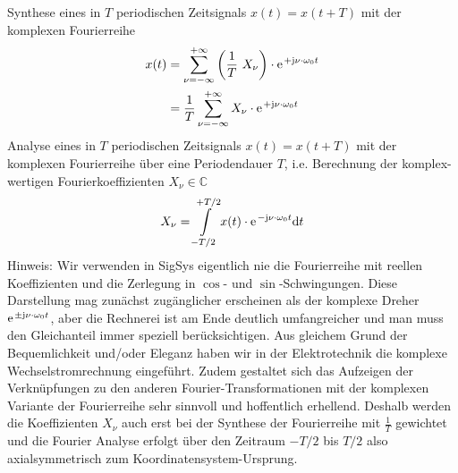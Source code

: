\begin{Werkzeug}
Synthese eines in $T$ periodischen Zeitsignals $x(t) = x(t+T)$ mit der komplexen Fourierreihe
%
\begin{align}
x(t)
&= \sum\limits_{\nu=-\infty}^{+\infty} \left(\frac{1}{T} \,\,X_\nu\right) \cdot \e^{+\im \nu \cdot \omega_0 t}\\
&= \frac{1}{T}\sum\limits_{\nu=-\infty}^{+\infty} X_\nu \cdot \e^{+\im \nu \cdot \omega_0 t}
\end{align}
%
Analyse eines in $T$ periodischen Zeitsignals $x(t)=x(t+T)$ mit der komplexen Fourierreihe über eine Periodendauer $T$, i.e.
Berechnung der komplex-wertigen Fourierkoeffizienten $X_\nu\in\mathbb{C}$
\begin{equation}
X_\nu =  \int\limits_{-T/2}^{+T/2} x(t) \cdot \e^{-\im \nu \cdot \omega_0 t} \mathrm{d}t
\end{equation}
%
Hinweis: Wir verwenden in SigSys eigentlich nie die Fourierreihe mit
reellen Koeffizienten und die Zerlegung in $\cos$- und $\sin$-Schwingungen.
%
Diese Darstellung mag zunächst zugänglicher erscheinen als der komplexe
Dreher $\e^{\pm\im \nu \cdot \omega_0 t}$, aber die Rechnerei ist am Ende deutlich
umfangreicher und man muss den Gleichanteil immer speziell berücksichtigen.
%
Aus gleichem Grund der Bequemlichkeit und/oder Eleganz haben wir in der
Elektrotechnik die komplexe Wechselstromrechnung eingeführt.
%
Zudem gestaltet sich das Aufzeigen der Verknüpfungen zu den anderen
Fourier-Transformationen mit der komplexen Variante der Fourierreihe sehr sinnvoll
und hoffentlich erhellend.
%
Deshalb werden die Koeffizienten $X_\nu$ auch erst bei der Synthese der
Fourierreihe mit $\frac{1}{T}$ gewichtet und die Fourier Analyse erfolgt über
den Zeitraum $-T/2$ bis $T/2$ also axialsymmetrisch zum Koordinatensystem-Ursprung.
\end{Werkzeug}

